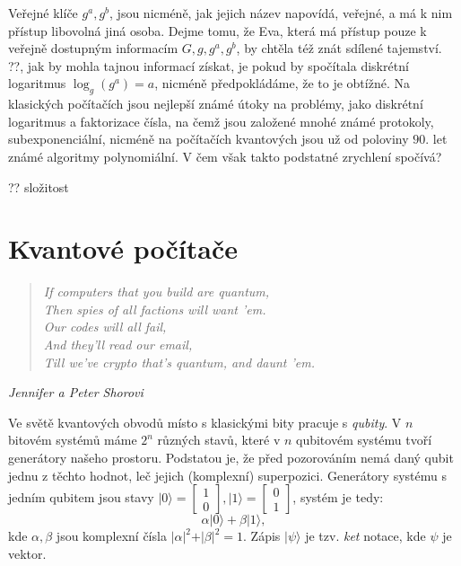 \documentclass [12pt]{report}
\begin{document}
Veřejné klíče $g^a,g^b$, jsou nicméně, jak jejich název napovídá, veřejné, a má k nim přístup libovolná jiná osoba. Dejme tomu, že Eva, která má přístup pouze k veřejně dostupným informacím $G,g,g^a,g^b$, by chtěla též znát sdílené tajemství. ??, jak by mohla tajnou informací získat, je pokud by spočítala diskrétní logaritmus $\log_g(g^a) = a$, nicméně předpokládáme, že to je obtížné. Na klasických počítačích jsou nejlepší známé útoky na problémy, jako diskrétní logaritmus a faktorizace čísla, na čemž jsou založené mnohé známé protokoly, subexponenciální, nicméně na počítačích kvantových jsou už od poloviny $90$. let známé algoritmy polynomiální. V čem však takto podstatné zrychlení spočívá?

?? složitost

\section{Kvantové počítače}

\begin{center}
\begin{verse}
\qquad \textit{If computers that you build are quantum,}\\
\qquad \textit{Then spies of all factions will want 'em.}\\
\qquad \textit{Our codes will all fail,}\\
\qquad \textit{And they'll read our email,}\\
\qquad \textit{Till we've crypto that's quantum, and daunt 'em. }
\end{verse}
\hfill \textit{Jennifer a Peter Shorovi}
\end{center}

Ve světě kvantových obvodů místo s klasickými bity pracuje s \textit{qubity}. V $n$ bitovém systémů máme $2^n$ různých stavů, které v $n$ qubitovém systému tvoří generátory našeho prostoru. Podstatou je, že před pozorováním nemá daný qubit jednu z těchto hodnot, leč jejich (komplexní) superpozici. Generátory systému s jedním qubitem jsou stavy $\vert 0 \rangle = \begin{bmatrix}
1 \\
0
\end{bmatrix}, \vert 1 \rangle = \begin{bmatrix}
0 \\
1
\end{bmatrix}$, systém je tedy:
\begin{equation*}
\alpha \vert 0 \rangle + \beta \vert 1 \rangle,
\end{equation*}
kde $\alpha, \beta$ jsou komplexní čísla $\vert \alpha \vert ^2 + \vert \beta \vert ^2 = 1$. Zápis $\vert \psi \rangle$ je tzv. \textit{ket} notace, kde $\psi$ je vektor.\\
\end{document}
